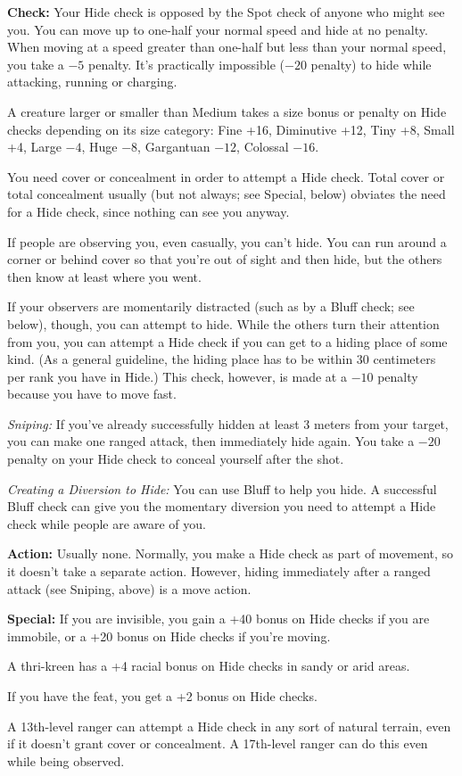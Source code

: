 \textbf{Check:} Your Hide check is opposed by the Spot check of anyone who might see you. You can move up to one-half your normal speed and hide at no penalty. When moving at a speed greater than one-half but less than your normal speed, you take a $-5$ penalty. It's practically impossible ($-20$ penalty) to hide while attacking, running or charging.

A creature larger or smaller than Medium takes a size bonus or penalty on Hide checks depending on its size category: Fine +16, Diminutive +12, Tiny +8, Small +4, Large $-4$, Huge $-8$, Gargantuan $-12$, Colossal $-16$.

You need cover or concealment in order to attempt a Hide check. Total cover or total concealment usually (but not always; see Special, below) obviates the need for a Hide check, since nothing can see you anyway.

If people are observing you, even casually, you can't hide. You can run around a corner or behind cover so that you're out of sight and then hide, but the others then know at least where you went.

If your observers are momentarily distracted (such as by a Bluff check; see below), though, you can attempt to hide. While the others turn their attention from you, you can attempt a Hide check if you can get to a hiding place of some kind. (As a general guideline, the hiding place has to be within 30 centimeters per rank you have in Hide.) This check, however, is made at a $-10$ penalty because you have to move fast.

\textit{Sniping:} If you've already successfully hidden at least 3 meters from your target, you can make one ranged attack, then immediately hide again. You take a $-20$ penalty on your Hide check to conceal yourself after the shot.

\textit{Creating a Diversion to Hide:} You can use Bluff to help you hide. A successful Bluff check can give you the momentary diversion you need to attempt a Hide check while people are aware of you.

\textbf{Action:} Usually none. Normally, you make a Hide check as part of movement, so it doesn't take a separate action. However, hiding immediately after a ranged attack (see Sniping, above) is a move action.

\textbf{Special:} If you are invisible, you gain a +40 bonus on Hide checks if you are immobile, or a +20 bonus on Hide checks if you're moving.

A thri-kreen has a +4 racial bonus on Hide checks in sandy or arid areas.

If you have the  feat, you get a +2 bonus on Hide checks.

A 13th-level ranger can attempt a Hide check in any sort of natural terrain, even if it doesn't grant cover or concealment. A 17th-level ranger can do this even while being observed.